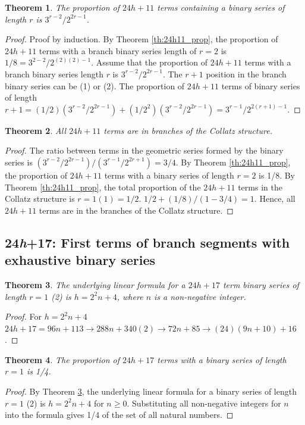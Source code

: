 \documentclass[sn-mathphys-num, pdflatex]{sn-jnl}
\newtheorem{theorem}{Theorem}[section]
\begin{document}
\begin{theorem}
    The proportion of $24h+11$ terms containing a binary series of length $r$ is $3^{r-2}/2^{2r-1}$.
\end{theorem}
\begin{proof}
    Proof by induction.
    By Theorem \ref{th:24h11_prop}, the proportion of $24h+11$ terms with a branch binary series length of $r=2$ is $1/8 = 3^{2-2}/2^{(2)(2)-1}$.
    Assume that the proportion of $24h+11$ terms with a branch binary series length $r$ is $3^{r-2}/2^{2r-1}$.
    The $r+1$ position in the branch binary series can be (1) or (2).
    The proportion of $24h+11$ terms of binary series of length $r+1 = (1/2)(3^{r-2}/2^{2r-1})+(1/2^2)(3^{r-2}/2^{2r-1}) = 3^{r-1}/2^{2(r+1)-1}$.
\end{proof}

\begin{theorem}\label{th:24h11_final}
    All $24h+11$ terms are in branches of the Collatz structure.
\end{theorem}
\begin{proof}
    The ratio between terms in the geometric series formed by the binary series is $(3^{r-2}/2^{2r-1}) / (3^{r-1}/2^{2r+1}) = 3/4$.
    By Theorem \ref{th:24h11_prop}, the proportion of $24h+11$ terms with a binary series of length $r=2$ is 1/8.
    By Theorem \ref{th:24h11_prop}, the total proportion of the $24h+11$ terms in the Collatz structure is $r=1 (1) = 1/2$. $1/2+(1/8)/(1 - 3/4) = 1$.
    Hence, all $24h+11$ terms are in the branches of the Collatz structure.
\end{proof}

\subsection{24\textit{h}+17: First terms of branch segments with exhaustive binary series}\label{sec6.8}
\begin{theorem}\label{th:24h17_base}
    The underlying linear formula for a $24h+17$ term binary series of length $r=1$ (2) is $h=2^2n+4$, where $n$ is a non-negative integer.
\end{theorem}
\begin{proof}
    For $h=2^2n+4$ $24h+17 = 96n+113\to 288n+340(2)\to 72n+85\to (24)(9n+10)+16$.
\end{proof}

\begin{theorem}\label{th:24h17_prop}
    The proportion of $24h+17$ terms with a binary series of length $r=1$ is 1/4.
\end{theorem}
\begin{proof}
    By Theorem \ref{th:24h17_base}, the underlying linear formula for a binary series of length $r=1$ (2) is $h=2^2n+4$ for $n \ge 0$. Substituting all non-negative integers for $n$ into the formula gives 1/4 of the set of all natural numbers.
\end{proof}
\end{document}

